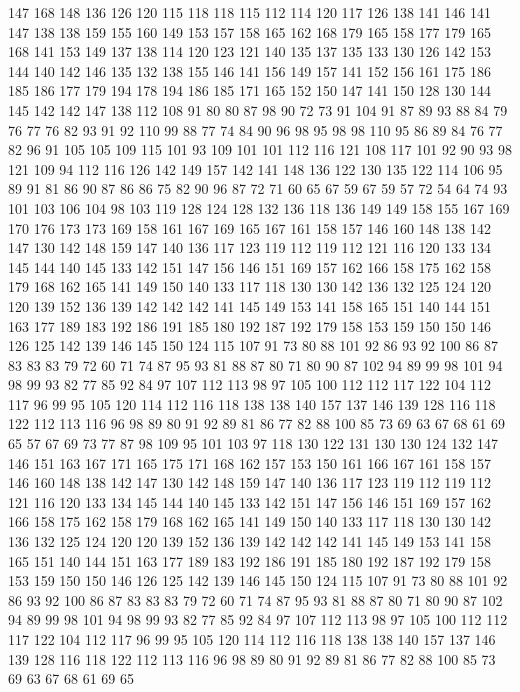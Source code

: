 147 168 148 136 126 120 115 118 118 115 112 114 120 117 126 138 141 146 141 147
138 138 159 155 160 149 153 157 158 165 162 168 179 165 158 177 179 165 168 141
153 149 137 138 114 120 123 121 140 135 137 135 133 130 126 142 153 144 140 142
146 135 132 138 155 146 141 156 149 157 141 152 156 161 175 186 185 186 177 179
194 178 194 186 185 171 165 152 150 147 141 150 128 130 144 145 142 142 147 138
112 108 91 80 80 87 98 90 72 73 91 104 91 87 89 93 88 84 79 76
77 76 82 93 91 92 110 99 88 77 74 84 90 96 98 95 98 98 110 95
86 89 84 76 77 82 96 91 105 105 109 115 101 93 109 101 101 112 116 121
108 117 101 92 90 93 98 121 109 94 112 116 126 142 149 157 142 141 148 136
122 130 135 122 114 106 95 89 91 81 86 90 87 86 86 75 82 90 96 87
72 71 60 65 67 59 67 59 57 72 54 64 74 93 101 103 106 104 98 103
119 128 124 128 132 136 118 136 149 149 158 155 167 169 170 176 173 173 169 158
161 167 169 165 167 161 158 157 146 160 148 138 142 147 130 142 148 159 147 140
136 117 123 119 112 119 112 121 116 120 133 134 145 144 140 145 133 142 151 147
156 146 151 169 157 162 166 158 175 162 158 179 168 162 165 141 149 150 140 133
117 118 130 130 142 136 132 125 124 120 120 139 152 136 139 142 142 142 141 145
149 153 141 158 165 151 140 144 151 163 177 189 183 192 186 191 185 180 192 187
192 179 158 153 159 150 150 146 126 125 142 139 146 145 150 124 115 107 91 73
80 88 101 92 86 93 92 100 86 87 83 83 83 79 72 60 71 74 87 95
93 81 88 87 80 71 80 90 87 102 94 89 99 98 101 94 98 99 93 82
77 85 92 84 97 107 112 113 98 97 105 100 112 112 117 122 104 112 117 96
99 95 105 120 114 112 116 118 138 138 140 157 137 146 139 128 116 118 122 112
113 116 96 98 89 80 91 92 89 81 86 77 82 88 100 85 73 69 63 67
68 61 69 65 57 67 69 73 77 87 98 109 95 101 103 97 118 130 122 131
130 130 124 132 147 146 151 163 167 171 165 175 171 168 162 157 153 150 161 166
167 161 158 157 146 160 148 138 142 147 130 142 148 159 147 140 136 117 123 119
112 119 112 121 116 120 133 134 145 144 140 145 133 142 151 147 156 146 151 169
157 162 166 158 175 162 158 179 168 162 165 141 149 150 140 133 117 118 130 130
142 136 132 125 124 120 120 139 152 136 139 142 142 142 141 145 149 153 141 158
165 151 140 144 151 163 177 189 183 192 186 191 185 180 192 187 192 179 158 153
159 150 150 146 126 125 142 139 146 145 150 124 115 107 91 73 80 88 101 92
86 93 92 100 86 87 83 83 83 79 72 60 71 74 87 95 93 81 88 87
80 71 80 90 87 102 94 89 99 98 101 94 98 99 93 82 77 85 92 84
97 107 112 113 98 97 105 100 112 112 117 122 104 112 117 96 99 95 105 120
114 112 116 118 138 138 140 157 137 146 139 128 116 118 122 112 113 116 96 98
89 80 91 92 89 81 86 77 82 88 100 85 73 69 63 67 68 61 69 65
